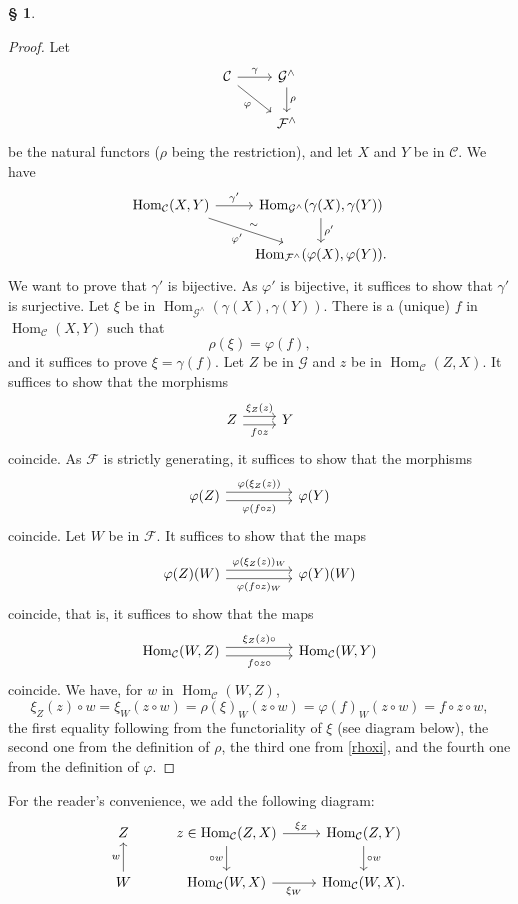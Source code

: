 \documentclass[12pt]{article}%
\theoremstyle{remark}
\theoremstyle{definition}
\newtheorem{s}[thm]{\S}%
\newcommand{\C}{\mathcal C}
\newcommand{\F}{\mathcal F}
\newcommand{\G}{\mathcal G}
\newcommand{\pp}{\varphi}
\DeclareMathOperator{\Hom}{Hom}%
\begin{document}
\begin{s}
\begin{proof}
Let 
$$
\begin{tikzcd}
\C\ar{r}{\gamma}\ar{dr}[swap]{\varphi}&\G^\wedge\ar{d}{\rho}\\
&\F^\wedge
\end{tikzcd}
$$ 
be the natural functors ($\rho$ being the restriction), and let $X$ and $Y$ be in $\C$. We have 
$$
\begin{tikzcd}
\Hom_\C(X,Y)\ar{r}{\gamma'}\ar{dr}{\sim}[swap]{\pp'}&\Hom_{\G^\wedge}(\gamma(X),\gamma(Y))\ar{d}{\rho'}\\ 
{}&\Hom_{\F^\wedge}(\varphi(X),\varphi(Y)). 
\end{tikzcd}
$$ 
We want to prove that $\gamma'$ is bijective. As $\pp'$ is bijective, it suffices to show that $\gamma'$ is surjective. Let $\xi$ be in $\Hom_{\G^\wedge}(\gamma(X),\gamma(Y))$. There is a (unique) $f$ in $\Hom_\C(X,Y)$ such that  
\begin{equation}\label{rhoxi}
\rho(\xi)=\varphi(f),
\end{equation}
and it suffices to prove $\xi=\gamma(f)$. Let $Z$ be in $\G$ and $z$ be in $\Hom_\C(Z,X)$. It suffices to show that the morphisms 
$$
\begin{tikzcd}
Z\arrow[yshift=0.7ex]{r}{\xi_Z(z)}\arrow[yshift=-0.7ex]{r}[swap]{f\circ z}&Y
\end{tikzcd}
$$ 
coincide. As $\F$ is strictly generating, it suffices to show that the morphisms 
$$
\begin{tikzcd}
\varphi(Z)\arrow[yshift=0.7ex]{rr}{\varphi(\xi_Z(z))}\arrow[yshift=-0.7ex]{rr}[swap]{\varphi(f\circ z)}&&\varphi(Y)
\end{tikzcd}
$$ 
coincide. Let $W$ be in $\F$. It suffices to show that the maps 
$$
\begin{tikzcd}
\varphi(Z)(W)\arrow[yshift=0.7ex]{rr}{\varphi(\xi_Z(z))_W}\arrow[yshift=-0.7ex]{rr}[swap]{\varphi(f\circ z)_W}&&\varphi(Y)(W)
\end{tikzcd}
$$ 
coincide, that is, it suffices to show that the maps 
$$
\begin{tikzcd}
\Hom_\C(W,Z)\arrow[yshift=0.7ex]{rr}{\xi_Z(z)\circ}\arrow[yshift=-0.7ex]{rr}[swap]{f\circ z\circ}&&\Hom_\C(W,Y)
\end{tikzcd}
$$ 
coincide. We have, for $w$ in $\Hom_\C(W,Z)$,
$$
\xi_Z(z)\circ w=\xi_W(z\circ w)=\rho(\xi)_W(z\circ w)=\varphi(f)_W(z\circ w)
=f\circ z\circ w, 
$$ 
the first equality following from the functoriality of $\xi$ (see diagram below), the second one from the definition of $\rho$, the third one from \eqref{rhoxi}, and the fourth one from the definition of $\varphi$.
\end{proof}
For the reader's convenience, we add the following diagram:
$$
\begin{tikzcd}
Z&z\in\Hom_\C(Z,X)\ar{r}{\xi_Z}\ar{d}[swap]{\circ w}&\Hom_\C(Z,Y)\ar{d}{\circ w}\\ 
W\ar{u}{w}&\Hom_\C(W,X)\ar{r}[swap]{\xi_W}&\Hom_\C(W,X).
\end{tikzcd}
$$
\end{s}
\end{document}
